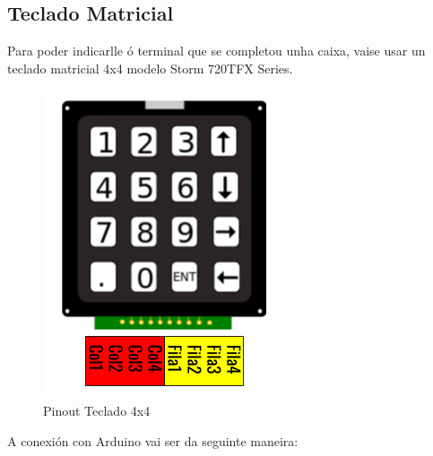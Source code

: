 \documentclass[11pt,twoside]{book}
\begin{document}
\subsection{Teclado Matricial}

Para poder indicarlle ó terminal que se completou unha caixa, vaise usar un teclado matricial 4x4 modelo Storm 720TFX Series. \cite{teclado}

\begin{figure}[H]
	\begin{center}
		\includegraphics[scale=0.75]{images/pinoutTeclado.png}
	\end{center}
	\caption{Pinout Teclado 4x4}
	\label{fig:TecladoStorm}
\end{figure}

A conexión con Arduino vai ser da seguinte maneira:
\end{document}
